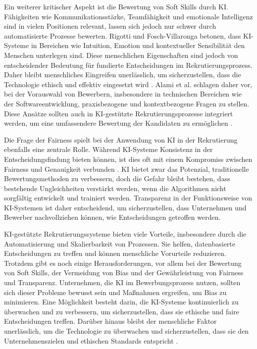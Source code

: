 Ein weiterer kritischer Aspekt ist die Bewertung von Soft Skills durch \acs{KI}. Fähigkeiten  wie Kommunikationsstärke, Teamfähigkeit und emotionale Intelligenz sind in vielen Positionen relevant, lassen sich jedoch nur schwer durch automatisierte Prozesse bewerten. Rigotti und Fosch-Villaronga betonen, dass \acs{KI}-Systeme in Bereichen wie Intuition, Emotion und kontextueller Sensibilität den Menschen unterlegen sind. Diese menschlichen Eigenschaften sind jedoch von entscheidender Bedeutung für fundierte Entscheidungen im Rekrutierungsprozess. Daher bleibt menschliches Eingreifen unerlässlich, um sicherzustellen, dass die Technologie ethisch und effektiv eingesetzt wird \cite{rigotti:2024}. Alami et al. schlagen daher vor, bei der Vorauswahl von Bewerbern, insbesondere in technischen Bereichen wie der Softwareentwicklung, praxisbezogene und kontextbezogene Fragen zu stellen. Diese Ansätze sollten auch in \acs{KI}-gestützte Rekrutierungsprozesse integriert werden, um eine umfassendere Bewertung der Kandidaten zu ermöglichen \cite{alami:2024}.

Die Frage der Fairness spielt bei der Anwendung von \acs{KI} in der Rekrutierung ebenfalls eine zentrale Rolle. Während \acs{KI}-Systeme Konsistenz in der Entscheidungsfindung bieten können, ist dies oft mit einem Kompromiss zwischen Fairness und Genauigkeit verbunden \cite{hunkenschroer:2022}. \acs{KI} bietet zwar das Potenzial, traditionelle Bewertungsmethoden zu verbessern, doch die Gefahr bleibt bestehen, dass bestehende Ungleichheiten verstärkt werden, wenn die Algorithmen nicht sorgfältig entwickelt und trainiert werden. Transparenz in der Funktionsweise von \acs{KI}-Systemen ist daher entscheidend, um sicherzustellen, dass Unternehmen und Bewerber nachvollziehen können, wie Entscheidungen getroffen werden.

\acs{KI}-gestützte Rekrutierungssysteme bieten viele Vorteile, insbesondere durch die Automatisierung und Skalierbarkeit von Prozessen. Sie helfen, datenbasierte Entscheidungen zu treffen und können menschliche Vorurteile reduzieren. Trotzdem gibt es noch einige Herausforderungen, vor allem bei der Bewertung von Soft Skills, der Vermeidung von Bias und der Gewährleistung von Fairness und Transparenz. Unternehmen, die \acs{KI} im Bewerbungsprozess nutzen, sollten sich dieser Probleme bewusst sein und Maßnahmen ergreifen, um Bias zu minimieren. Eine Möglichkeit besteht darin, die \acs{KI}-Systeme kontinuierlich zu überwachen und zu verbessern, um sicherzustellen, dass sie ethische und faire Entscheidungen treffen. Darüber hinaus bleibt der menschliche Faktor unerlässlich, um die Technologie zu überwachen und sicherzustellen, dass sie den Unternehmenszielen und ethischen Standards entspricht \cite{rigotti:2024}.
